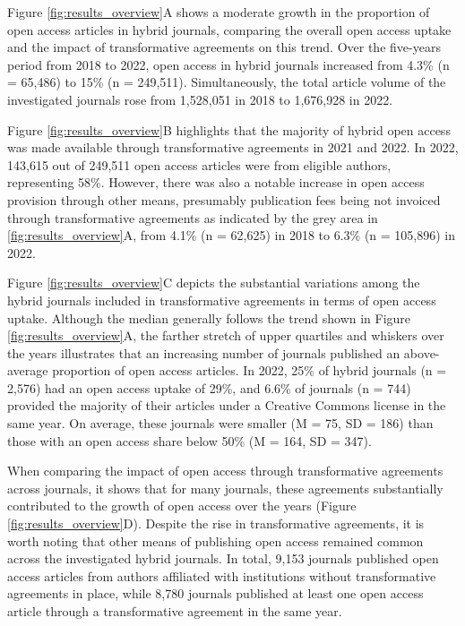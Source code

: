 \documentclass[a4paper,man,floatsintext,longtable,noextraspace,12pt]{apa6}
\begin{document}
Figure \ref{fig:results_overview}A shows a moderate growth in the
proportion of open access articles in hybrid journals, comparing the
overall open access uptake and the impact of transformative agreements
on this trend. Over the five-years period from 2018 to 2022, open access
in hybrid journals increased from 4.3\% (n = 65,486) to 15\% (n =
249,511). Simultaneously, the total article volume of the investigated
journals rose from 1,528,051 in 2018 to 1,676,928 in 2022.

Figure \ref{fig:results_overview}B highlights that the majority of
hybrid open access was made available through transformative agreements
in 2021 and 2022. In 2022, 143,615 out of 249,511 open access articles
were from eligible authors, representing 58\%. However, there was also a
notable increase in open access provision through other means,
presumably publication fees being not invoiced through transformative
agreements as indicated by the grey area in \ref{fig:results_overview}A,
from 4.1\% (n = 62,625) in 2018 to 6.3\% (n = 105,896) in 2022.

Figure \ref{fig:results_overview}C depicts the substantial variations
among the hybrid journals included in transformative agreements in terms
of open access uptake. Although the median generally follows the trend
shown in Figure \ref{fig:results_overview}A, the farther stretch of
upper quartiles and whiskers over the years illustrates that an
increasing number of journals published an above-average proportion of
open access articles. In 2022, 25\% of hybrid journals (n = 2,576) had
an open access uptake of 29\%, and 6.6\% of journals (n = 744) provided
the majority of their articles under a Creative Commons license in the
same year. On average, these journals were smaller (M = 75, SD = 186)
than those with an open access share below 50\% (M = 164, SD = 347).

When comparing the impact of open access through transformative
agreements across journals, it shows that for many journals, these
agreements substantially contributed to the growth of open access over
the years (Figure \ref{fig:results_overview}D). Despite the rise in
transformative agreements, it is worth noting that other means of
publishing open access remained common across the investigated hybrid
journals. In total, 9,153 journals published open access articles from
authors affiliated with institutions without transformative agreements
in place, while 8,780 journals published at least one open access
article through a transformative agreement in the same year.
\end{document}
